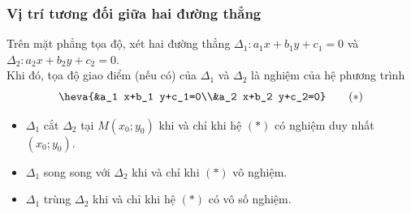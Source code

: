\subsubsection{Vị trí tương đối giữa hai đường thẳng}
	Trên mặt phẳng tọa độ, xét hai đường thẳng $\Delta_1 \colon a_1 x+b_1 y+c_1=0$ và $\Delta_2 \colon a_2 x+b_2 y+c_2=0$.\\
	Khi đó, tọa độ giao điểm (nếu có) của $\Delta_1$ và $\Delta_2$ là nghiệm của hệ phương trình
	$$\heva{&a_1 x+b_1 y+c_1=0\\&a_2 x+b_2 y+c_2=0}\qquad(*)$$
	\begin{itemize}
		\item $\Delta_1$ cắt $\Delta_2$ tại $M(x_0;y_0)$ khi và chỉ khi hệ $(*)$ có nghiệm duy nhất $(x_0;y_0)$.
		\item $\Delta_1$ song song với $\Delta_2$ khi và chỉ khi $(*)$ vô nghiệm.
		\item $\Delta_1$ trùng $\Delta_2$ khi và chỉ khi hệ $(*)$ có vô số nghiệm.
	\end{itemize}
